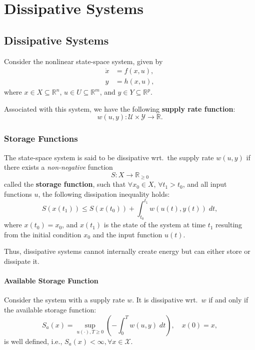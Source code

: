 \section{Dissipative Systems}
\subsection{Dissipative Systems}

Consider the nonlinear state-space system, given by
\begin{align*}
    \dot{x} & = f(x, u), \\
    y       & = h(x, u),
\end{align*}
where $x \in X \subseteq \mathbb{R}^n$, $u \in U \subseteq \mathbb{R}^m$, and $y \in Y \subseteq \mathbb{R}^p$.

Associated with this system, we have the following \textbf{supply rate function}:
\begin{equation*}
    w(u, y) : \mathcal{U} \times \mathcal{Y} \to \mathbb{R}.
\end{equation*}

\subsubsection{Storage Functions}

The state-space system is said to be dissipative wrt.\ the supply rate $w(u, y)$ if there exists a \textit{non-negative} function
\begin{equation*}
    S : X \to \mathbb{R}_{\geq 0}
\end{equation*}
called the \textbf{storage function}, such that $\forall x_0 \in X$, $\forall t_1 > t_0$, and all input functions $u$, the following dissipation inequality holds:
\begin{equation*}
    S(x(t_1)) \leq S(x(t_0)) + \int_{t_0}^{t_1} w(u(t), y(t)) \; dt,
\end{equation*}
where $x(t_0) = x_0$, and $x(t_1)$ is the state of the system at time $t_1$ resulting from the initial condition $x_0$ and the input function $u(t)$.

Thus, dissipative systems cannot internally create energy but can either store or dissipate it.

\paragraph{Available Storage Function}

Consider the system with a supply rate $w$. It is dissipative wrt.\ $w$ if and only if the available storage function:
\begin{equation*}
    S_a(x) = \sup_{u(\cdot), T \geq 0} \left( - \int_0^T w(u, y) \; dt \right), \quad x(0) = x,
\end{equation*}
is well defined, i.e., $S_a(x) < \infty, \forall x \in \mathcal{X}$.

